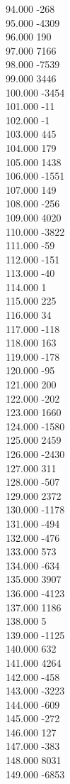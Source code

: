 { 94.000	-268 \\
 95.000	-4309 \\
 96.000	190 \\
 97.000	7166 \\
 98.000	-7539 \\
 99.000	3446 \\
 100.000	-3454 \\
 101.000	-11 \\
 102.000	-1 \\
 103.000	445 \\
 104.000	179 \\
 105.000	1438 \\
 106.000	-1551 \\
 107.000	149 \\
 108.000	-256 \\
 109.000	4020 \\
 110.000	-3822 \\
 111.000	-59 \\
 112.000	-151 \\
 113.000	-40 \\
 114.000	1 \\
 115.000	225 \\
 116.000	34 \\
 117.000	-118 \\
 118.000	163 \\
 119.000	-178 \\
 120.000	-95 \\
 121.000	200 \\
 122.000	-202 \\
 123.000	1660 \\
 124.000	-1580 \\
 125.000	2459 \\
 126.000	-2430 \\
 127.000	311 \\
 128.000	-507 \\
 129.000	2372 \\
 130.000	-1178 \\
 131.000	-494 \\
 132.000	-476 \\
 133.000	573 \\
 134.000	-634 \\
 135.000	3907 \\
 136.000	-4123 \\
 137.000	1186 \\
 138.000	5 \\
 139.000	-1125 \\
 140.000	632 \\
 141.000	4264 \\
 142.000	-458 \\
 143.000	-3223 \\
 144.000	-609 \\
 145.000	-272 \\
 146.000	127 \\
 147.000	-383 \\
 148.000	8031 \\
 149.000	-6853 \\
}
